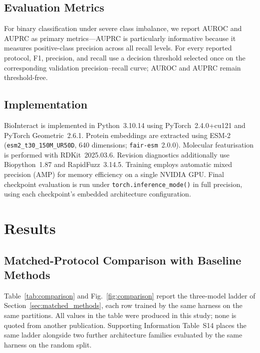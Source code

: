 \documentclass[fleqn,10pt]{wlscirep}
\begin{document}
\subsection{Evaluation Metrics}

For binary classification under severe class imbalance, we report AUROC and
AUPRC as primary metrics---AUPRC is particularly informative because it measures
positive-class precision across all recall levels. For every reported protocol,
F1, precision, and recall use a decision threshold selected once on the
corresponding validation precision--recall curve; AUROC and AUPRC remain
threshold-free.

\subsection{Implementation}

BioInteract is implemented in Python~3.10.14 using PyTorch~2.4.0+cu121 and
PyTorch Geometric~2.6.1.\cite{fey2019fast} Protein embeddings are extracted using
ESM-2\cite{lin2023evolutionary} (\texttt{esm2\_t30\_150M\_UR50D}, 640
dimensions; \texttt{fair-esm}~2.0.0). Molecular featurisation is performed with
RDKit~2025.03.6.\cite{rdkit} Revision diagnostics additionally use
Biopython~1.87 and RapidFuzz~3.14.5. Training employs automatic mixed precision (AMP) for
memory efficiency on a single NVIDIA GPU. Final checkpoint evaluation is run
under \texttt{torch.inference\_mode()} in full precision, using each checkpoint's
embedded architecture configuration.

\section{Results}
\label{sec:results}

\subsection{Matched-Protocol Comparison with Baseline Methods}
\label{sec:matched}

Table~\ref{tab:comparison} and Fig.~\ref{fig:comparison} report the
three-model ladder of Section~\ref{sec:matched_methods}, each row trained by the
same harness on the same partitions.  All values in the table were produced in
this study; none is quoted from another publication.  Supporting Information
Table~S14 places the same ladder alongside two further architecture families
evaluated by the same harness on the random split.
\end{document}
